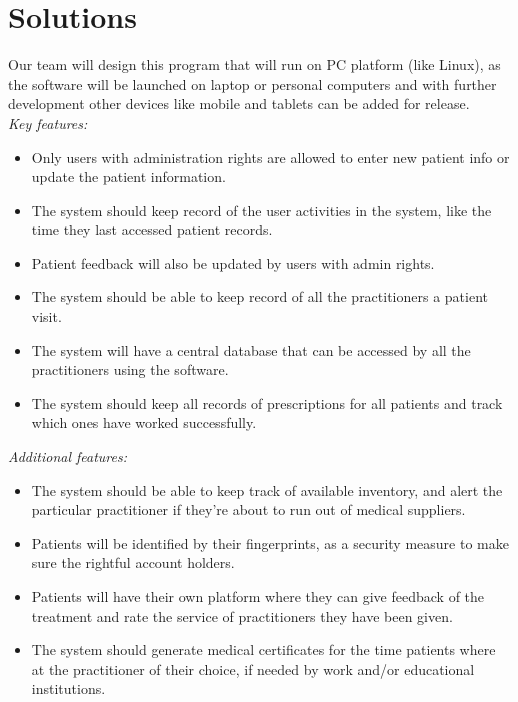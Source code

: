 \documentclass[a4paper]{article}
\begin{document}
\section*{Solutions}

Our team will design this program that will run on PC platform (like Linux), as the software will be launched on laptop or personal computers and with further development other devices like mobile and tablets can be added for release. \\

\noindent \large \textit{Key features:} \\

\begin{itemize}

\item Only users with administration rights are allowed to enter new patient info or update the patient information.

\item The system should keep record of the user activities in the system, like the time they last accessed patient records.

\item Patient feedback will also be updated by users with admin rights.

\item The system should be able to keep record of all the practitioners a patient visit.

\item The system will have a central database that can be accessed by all the practitioners using the software.

\item The system should keep all records of prescriptions for all patients and track which ones have worked successfully. \\

\end{itemize}

\noindent \large \textit{Additional features:} \\

\begin{itemize}

\item The system should be able to keep track of available inventory, and alert the particular practitioner if they’re about to run out of medical suppliers.

\item Patients will be identified by their fingerprints, as a security measure to make sure the rightful account holders.

\item Patients will have their own platform where they can give feedback of the treatment and rate the service of practitioners they have been given.

\item The system should generate medical certificates for the time patients where at the practitioner of their choice, if needed by work and/or educational institutions.

\end{itemize}
\end{document}

